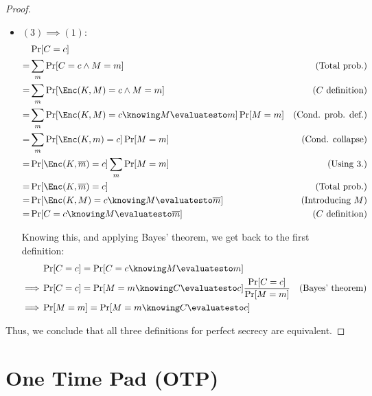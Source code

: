 \begin{proof}
\begin{itemize}
        \item $(3) \implies (1)$:
        \begin{align*}
            & \Pr[C = c] & \\
            =& \sum_{m}\Pr[C = c \wedge M = m]                                  & \text{(Total prob.)} \\
            =& \sum_{m}\Pr[\Enc(K, M) = c \wedge M = m]                         & \text{($C$ definition)} \\
            =& \sum_{m}\Pr[\Enc(K, M) = c \knowing M \evaluatesto m] \Pr[M = m] & \text{(Cond. prob. def.)} \\
            =& \sum_{m}\Pr[\Enc(K, m) = c] \Pr[M = m]                           & \text{(Cond. collapse)} \\
            =& \Pr[\Enc(K, \overline{m}) = c] \sum_{m} \Pr[M = m]               & \text{(Using 3.)} \\ %
            =& \Pr[\Enc(K, \overline{m}) = c]                                   & \text{(Total prob.)} \\
            =& \Pr[\Enc(K, M) = c \knowing M \evaluatesto \overline{m}]         & \text{(Introducing $M$)} \\
            =& \Pr[C = c \knowing M \evaluatesto \overline{m}]                  & \text{($C$ definition)} \\
        \end{align*}

        Knowing this, and applying Bayes' theorem, we get back to the first definition:
        \begin{align*}
            & \Pr[C = c] = \Pr[C = c \knowing M \evaluatesto m]                                         & \\
            \implies& \Pr[C = c] = \Pr[M = m \knowing C \evaluatesto c] \frac{\Pr[C = c]}{\Pr[M = m]}   & \text{(Bayes' theorem)} \\
            \implies& \Pr[M = m] = \Pr[M = m \knowing C \evaluatesto c]                                 & \\
        \end{align*}

    \end{itemize}

    Thus, we conclude that all three definitions for perfect secrecy are equivalent.

\end{proof}

\section{One Time Pad (OTP)}

